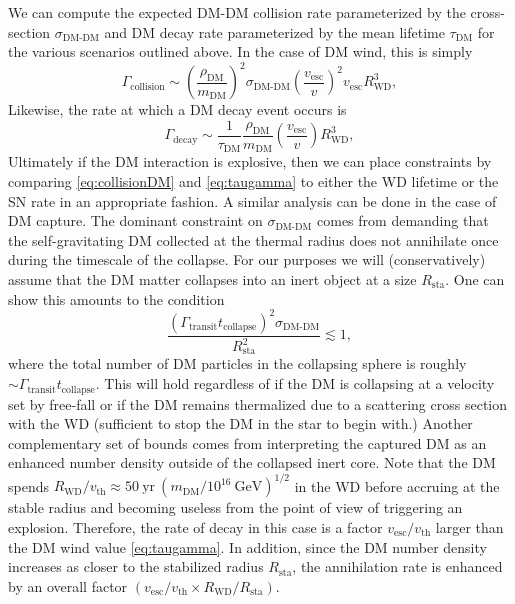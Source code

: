 \documentclass[twocolumn,preprintnumbers,amsmath,amssymb,prl, superscriptaddress]{revtex4}
\newcommand{\GeV}{\text{GeV}}
\def\r{\right)}
\def\l{\left(}
\begin{document}
We can compute the expected DM-DM collision rate parameterized by the cross-section $\sigma_\text{DM-DM}$ and DM decay rate parameterized by the mean lifetime $\tau_\text{DM}$ for the various scenarios outlined above.
In the case of DM wind, this is simply
\begin{equation}
\Gamma_\text{collision} \sim \l \frac{\rho_\text{DM}}{m_\text{DM}} \r^2 \sigma_\text{DM-DM} \l \frac{v_\text{esc}}{v}\r^2 v_\text{esc} R_\text{WD}^3,
\label{eq:collisionDM}
\end{equation}
Likewise, the rate at which a DM decay event occurs is
\begin{equation}
\Gamma_\text{decay} \sim  \frac{1}{\tau_\text{DM}} \frac{\rho_{\text{DM}}}{m_\text{DM}} \l \frac{v_\text{esc}}{v}\r R_\text{WD}^3,
\label{eq:taugamma}
\end{equation}
Ultimately if the DM interaction is explosive, then we can place constraints by comparing \eqref{eq:collisionDM} and \eqref{eq:taugamma} to either the WD lifetime or the SN rate in an appropriate fashion.
A similar analysis can be done in the case of DM capture.
The dominant constraint on $\sigma_\text{DM-DM}$ comes from demanding that the self-gravitating DM collected at the thermal radius does not annihilate once during the timescale of the collapse.
For our purposes we will (conservatively) assume that the DM matter collapses into an inert object at a size $R_\text{sta}$.
One can show this amounts to the condition
\begin{equation}
\frac{(\Gamma_\text{transit} t_\text{collapse})^2 \sigma_\text{DM-DM}}{R_\text{sta}^2} \lesssim 1,
\end{equation}
where the total number of DM particles in the collapsing sphere is roughly $\sim \Gamma_\text{transit} t_\text{collapse}$.
This will hold regardless of if the DM is collapsing at a velocity set by free-fall or if the DM remains thermalized due to a scattering cross section with the WD (sufficient to stop the DM in the star to begin with.)
Another complementary set of bounds comes from interpreting the captured DM as an enhanced number density outside of the collapsed inert core.
Note that the DM spends $R_\text{WD}/v_\text{th} \approx 50 ~\text{yr} ~(m_\text{DM}/10^{16} ~\GeV)^{1/2}$ in the WD before accruing at the stable radius and becoming useless from the point of view of triggering an explosion.
Therefore, the rate of decay in this case is a factor $v_\text{esc}/v_\text{th}$ larger than the DM wind value \eqref{eq:taugamma}.
In addition, since the DM number density increases as closer to the stabilized radius $R_\text{sta}$, the annihilation rate is enhanced by an overall factor $(v_\text{esc}/v_\text{th} \times R_\text{WD}/R_\text{sta})$.
\end{document}
